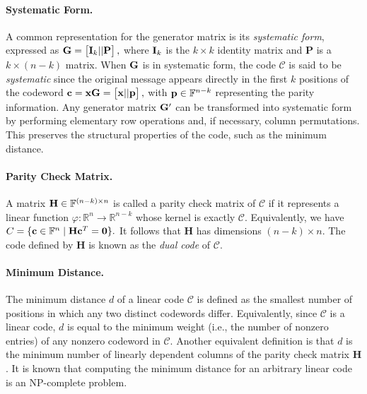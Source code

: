 \paragraph{Systematic Form.}
A common representation for the generator matrix is its \emph{systematic form}, expressed as
\(
\mathbf{G} = \begin{bmatrix} \mathbf{I}_k || \mathbf{P} \end{bmatrix},
\)
where $\mathbf{I}_k$ is the $k\times k$ identity matrix and $\mathbf{P}$ is a $k \times (n-k)$ matrix. When $\mathbf{G}$ is in systematic form, the code $\mathcal{C}$ is said to be \emph{systematic} since the original message appears directly in the first $k$ positions of the codeword
\(
\mathbf{c} = \mathbf{x}\mathbf{G} = \begin{bmatrix} \mathbf{x} || \mathbf{p} \end{bmatrix},
\)
with $\mathbf{p}\in\mathbb{F}^{n-k}$ representing the parity information. Any generator matrix $\mathbf{G}'$ can be transformed into systematic form by performing elementary row operations and, if necessary, column permutations. This preserves the structural properties of the code, such as the minimum distance.

\paragraph{Parity Check Matrix.}
A matrix $\mathbf{H}\in\mathbb{F}^{(n-k)\times n}$ is called a parity check matrix of $\mathcal{C}$ if it represents a linear function 
\(
\varphi: \mathbb{R}^n \to \mathbb{R}^{n-k}
\)
whose kernel is exactly $\mathcal{C}$. Equivalently, we have
\(
C = \{ \mathbf{c} \in \mathbb{F}^n \mid \mathbf{H}\mathbf{c}^T = \mathbf{0} \}.
\)
It follows that $\mathbf{H}$ has dimensions $(n-k)\times n$. The code defined by $\mathbf{H}$ is known as the \emph{dual code} of $\mathcal{C}$.

\paragraph{Minimum Distance.}
The minimum distance $d$ of a linear code $\mathcal{C}$ is defined as the smallest number of positions in which any two distinct codewords differ. Equivalently, since $\mathcal{C}$ is a linear code, $d$ is equal to the minimum weight (i.e., the number of nonzero entries) of any nonzero codeword in $\mathcal{C}$. Another equivalent definition is that $d$ is the minimum number of linearly dependent columns of the parity check matrix $\mathbf{H}$. It is known that computing the minimum distance for an arbitrary linear code is an NP-complete problem.

